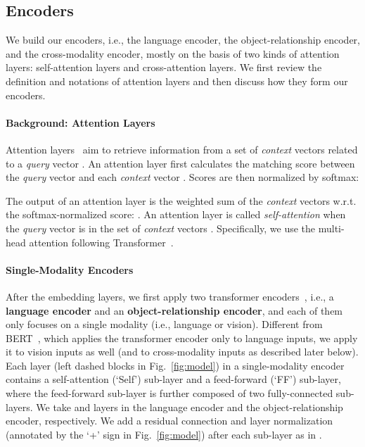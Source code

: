 \documentclass[11pt,a4paper]{article}
\begin{document}
\subsection{Encoders}
\label{sec:encoder}
We build our encoders, i.e., the language encoder, the object-relationship encoder, and the cross-modality encoder, mostly on the basis of two kinds of attention layers: self-attention layers and cross-attention layers. We first review the definition and notations of attention layers and then discuss how they form our encoders.
\paragraph{Background: Attention Layers} 
\label{sec:att}
Attention layers~\cite{bahdanau2014neural, xu2015show} aim to retrieve information from a set of \emph{context} vectors  related to a \emph{query} vector .
An attention layer first calculates the matching score  between the \emph{query} vector  and each \emph{context} vector . Scores are then normalized by softmax:

The output of an attention layer is the weighted sum of the \emph{context} vectors w.r.t. the softmax-normalized score:
.
An attention layer is called \emph{self-attention} when the \emph{query} vector  is in the set of \emph{context} vectors .
Specifically, we use the multi-head attention following Transformer~\cite{vaswani2017attention}.

\paragraph{Single-Modality Encoders}
\label{sec:selfatt}
After the embedding layers, we first apply two transformer encoders~\cite{vaswani2017attention}, i.e., a \textbf{language encoder} and an \textbf{object-relationship encoder}, and each of them only focuses on a single modality (i.e., language or vision).
Different from BERT~\cite{devlin2018bert}, which applies the transformer encoder only to language inputs, we apply it to vision inputs as well (and to cross-modality inputs as described later below). 
Each layer (left dashed blocks in Fig.~\ref{fig:model}) in a single-modality encoder contains a self-attention (`Self') sub-layer and a feed-forward (`FF') sub-layer, where the feed-forward sub-layer is further composed of two fully-connected sub-layers.
We take  and  layers in the language encoder and the object-relationship encoder, respectively. 
We add a residual connection and layer normalization (annotated by the `+' sign in Fig.~\ref{fig:model}) after each sub-layer as in .
\end{document}
